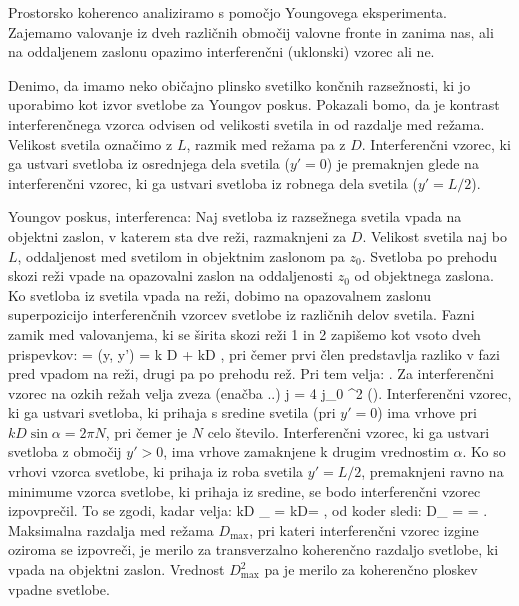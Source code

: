 Prostorsko koherenco analiziramo s pomočjo Youngovega eksperimenta. Zajemamo valovanje
iz dveh različnih območij valovne fronte in zanima nas, ali na oddaljenem zaslonu
opazimo interferenčni (uklonski) vzorec ali ne.

Denimo, da imamo neko običajno plinsko svetilko končnih razsežnosti, ki jo uporabimo kot
izvor svetlobe za Youngov poskus. Pokazali bomo, da je kontrast interferenčnega vzorca odvisen
od velikosti svetila in od razdalje med režama. Velikost svetila označimo z $L$, razmik med
režama pa z $D$. Interferenčni vzorec, ki ga ustvari svetloba iz osrednjega dela svetila ($y'=0$)
je premaknjen glede na interferenčni vzorec, ki ga ustvari svetloba iz robnega dela svetila 
($y'=L/2$).

Youngov poskus, interferenca: Naj svetloba iz razsežnega svetila vpada na objektni zaslon, 
v katerem sta dve reži, razmaknjeni za $D$. Velikost svetila naj bo $L$, oddaljenost med 
svetilom in objektnim zaslonom pa $z_0$. Svetloba po prehodu skozi reži vpade na opazovalni
zaslon na oddaljenosti $z_0$ od objektnega zaslona. Ko svetloba iz svetila vpada na reži, dobimo
na opazovalnem zaslonu superpozicijo interferenčnih vzorcev svetlobe iz različnih delov svetila. 
Fazni zamik med valovanjema, ki se širita skozi reži 1 in 2 zapišemo kot vsoto dveh prispevkov: 
\beq
\Delta \phi = \Delta \phi (y, y') = k D \sin \beta + kD \sin \alpha,
\eeq
pri čemer prvi člen predstavlja razliko v fazi pred vpadom na reži, drugi pa po 
prehodu rež. Pri tem velja:
\beq
\sin \alpha \approx \alpha \approx {} \qquad {} \qquad
\sin \beta \approx \beta \approx {}.
\eeq
Za interferenčni vzorec na ozkih režah velja zveza (enačba ..)
\beq
j = 4 j_0 \cos^2 \left(\right).
\eeq
Interferenčni vzorec, ki ga ustvari svetloba, ki prihaja s sredine svetila (pri $y'=0$) ima
vrhove pri $kD\sin \alpha = 2\pi N$, pri čemer je $N$ celo število. Interferenčni vzorec, ki 
ga ustvari svetloba z območij $y'>0$, ima vrhove zamaknjene k drugim vrednostim $\alpha$. Ko so 
vrhovi vzorca svetlobe, ki prihaja iz roba svetila $y'=L/2$, premaknjeni ravno na minimume
vzorca svetlobe, ki prihaja iz sredine, se bodo interferenčni vzorec izpovprečil. To se zgodi, 
kadar velja:
\beq
kD \sin\beta_ = kD= \pi,
\eeq
od koder sledi:
\beq
D_ =  = .
\eeq
Maksimalna razdalja med režama $D_\mathrm{max}$, pri kateri interferenčni vzorec izgine oziroma
se izpovreči, je merilo za transverzalno koherenčno razdaljo svetlobe, ki vpada na objektni zaslon.
Vrednost $D_\mathrm{max}^2$ pa je merilo za koherenčno ploskev vpadne svetlobe.

